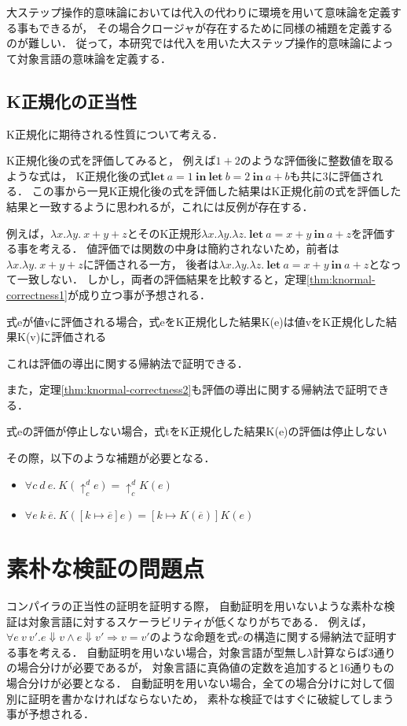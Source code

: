\documentclass{sumiilab-paper}
\newcommand{\keyword}[1]{\mathbf{#1}}
\newcommand{\LET}{\keyword{let}}
\newcommand{\IN}{\keyword{in}}
\begin{document}
大ステップ操作的意味論においては代入の代わりに環境を用いて意味論を定義する事もできるが，
その場合クロージャが存在するために同様の補題を定義するのが難しい．
従って，本研究では代入を用いた大ステップ操作的意味論によって対象言語の意味論を定義する．

\subsection{K正規化の正当性}
K正規化に期待される性質について考える．

K正規化後の式を評価してみると，
例えば$1+2$のような評価後に整数値を取るような式は，
K正規化後の式$\LET~a = 1~\IN~\LET~b = 2~\IN~a + b$も共に3に評価される．
この事から一見K正規化後の式を評価した結果はK正規化前の式を評価した結果と一致するように思われるが，これには反例が存在する．

例えば，$\lambda x.\lambda y.~x+y+z$とそのK正規形$\lambda x.\lambda y.\lambda z.~\LET~a = x+y~\IN~a + z$を評価する事を考える．
値評価では関数の中身は簡約されないため，前者は$\lambda x.\lambda y.~x+y+z$に評価される一方，
後者は$\lambda x.\lambda y.\lambda z.~\LET~a = x+y~\IN~a + z$となって一致しない．
しかし，両者の評価結果を比較すると，定理\ref{thm:knormal-correctness1}が成り立つ事が予想される．
\begin{theorem}\label{thm:knormal-correctness1}
	式eが値vに評価される場合，式eをK正規化した結果K(e)は値vをK正規化した結果K(v)に評価される
\end{theorem}
これは評価の導出に関する帰納法で証明できる．

また，定理\ref{thm:knormal-correctness2}も評価の導出に関する帰納法で証明できる．
\begin{theorem}\label{thm:knormal-correctness2}
	式eの評価が停止しない場合，式tをK正規化した結果K(e)の評価は停止しない
\end{theorem}
その際，以下のような補題が必要となる．

\begin{itemize}
	\item $\forall c~d~e.~K(\uparrow^d_c e) = \uparrow^d_c K(e)$
	\item $\forall e~k~\overline{e}.~K([k \mapsto \overline{e}]e)=[k \mapsto K(\overline{e})]K(e)$
\end{itemize}

\section{素朴な検証の問題点}
コンパイラの正当性の証明を証明する際，
自動証明を用いないような素朴な検証は対象言語に対するスケーラビリティが低くなりがちである．
例えば，$\forall e~v~v'.e\Downarrow v \land e\Downarrow v' \Longrightarrow v = v'$のような命題を式$e$の構造に関する帰納法で証明する事を考える．
自動証明を用いない場合，対象言語が型無し$\lambda$計算ならば3通りの場合分けが必要であるが，
対象言語に真偽値の定数を追加すると16通りもの場合分けが必要となる．
自動証明を用いない場合，全ての場合分けに対して個別に証明を書かなければならないため，
素朴な検証ではすぐに破綻してしまう事が予想される．
\end{document}
